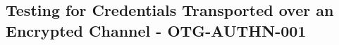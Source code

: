 \subsection{Testing for Credentials Transported over an Encrypted Channel - OTG-AUTHN-001}
\clearpage